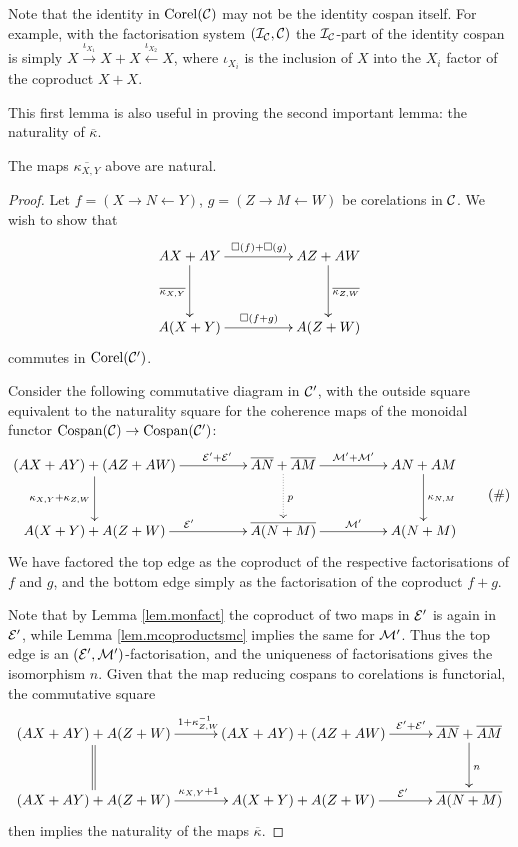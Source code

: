 Note that the identity in $\operatorname{{Corel}}(\mathcal C)$ may not be the identity cospan itself.
For example, with the factorisation system $(\mathcal I_{\mathcal C}, \mathcal C)$ the $\mathcal
I_{\mathcal C}$-part of the identity cospan is simply $X \xrightarrow{\iota_{X_1}}
X+X \xleftarrow{\iota_{X_2}} X$, where $\iota_{X_i}$ is the inclusion of
$X$ into the $X_i$ factor of the coproduct $X+X$.

This first lemma is also useful in proving the second important lemma: the
naturality of $\overline{\kappa}$.

\begin{lemma} \label{lem.corelfunmonoidal}
  The maps $\overline{\kappa_{X,Y}}$ above are natural.
\end{lemma}
\begin{proof}
  Let $f = (X \longrightarrow N \longleftarrow Y)$, $g= (Z \longrightarrow M
  \longleftarrow W)$ be corelations in $\mathcal C$. We wish to show that
  \[
    \xymatrixcolsep{4pc}
    \xymatrixrowsep{3pc}
    \xymatrix{
      AX+AY \ar[r]^{\square(f)+\square(g)}
      \ar[d]_{\overline{\kappa_{X,Y}}} & 
      AZ+AW \ar[d]^{\overline{\kappa_{Z,W}}} \\
      A(X+Y) \ar[r]^{\square(f+g)} & A(Z+W)
    }
  \]
  commutes in $\operatorname{{Corel}}(\mathcal C')$. 

  Consider the following commutative diagram in $\mathcal C'$, with the outside
  square equivalent to the naturality square for the coherence maps of the
  monoidal functor \linebreak $\operatorname{{Cospan}}(\mathcal C) \to \operatorname{{Cospan}}(\mathcal C')$:
  \[ \label{diag.natural}
    \begin{aligned}
      \xymatrixcolsep{4pc}
      \xymatrixrowsep{2.5pc}
      \xymatrix{
	(AX+AY)+(AZ+AW) \ar[r]^(.65){\mc E'+\mc E'}
	\ar[d]_{\kappa_{X,Y}+\kappa_{Z,W}} & 
	\overline{AN}+\overline{AM} \ar[r]^{\mc M'+\mc M'} \ar@{.>}[d]^{p} & 
	AN+AM \ar[d]^{\kappa_{N,M}}\\
	A(X+Y)+A(Z+W) \ar[r]^{\mc E'} & \overline{A(N+M)} \ar[r]^{\mc M'} & A(N+M)
      }
    \end{aligned}
    \tag{$\#$}
  \]
  We have factored the top edge as the coproduct of the respective
  factorisations of $f$ and $g$, and the bottom edge simply as the factorisation
  of the coproduct $f+g$. 

  Note that by Lemma \ref{lem.monfact} the coproduct of two maps in $\mathcal E'$ is
  again in $\mathcal E'$, while Lemma \ref{lem.mcoproductsmc} implies the same for
  $\mathcal M'$. Thus the top edge is an $(\mathcal E',\mathcal M')$-factorisation, and the
  uniqueness of factorisations gives the isomorphism $n$. 
  Given that the map reducing cospans to corelations is functorial, the
  commutative square
  \[
    \xymatrixcolsep{2.5pc}
    \xymatrixrowsep{2.5pc}
    \xymatrix{
      (AX+AY)+A(Z+W) \ar[r]^{1+\kappa_{Z,W}^{-1}} \ar@{=}[d] & (AX+AY)+(AZ+AW)
      \ar[r]^(.65){\mc E'+\mc E'} & 
      \overline{AN}+\overline{AM} \ar[d]^{n} \\
      (AX+AY)+A(Z+W) \ar[r]^{\kappa_{X,Y}+1} & A(X+Y)+A(Z+W) \ar[r]^(.6){\mc E'} & 
      \overline{A(N+M)}
    }
  \]
  then implies the naturality of the maps $\overline{\kappa}$.
\end{proof}

